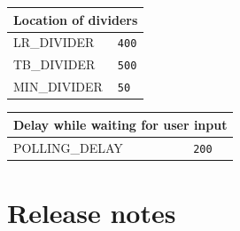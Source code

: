 \documentclass[11pt]{article}
\begin{document}
\begin{center}
\bigskip

\begin{tabular}{|p{}|p{}|}
\hline
\multicolumn{2}{|c|}{Location of dividers}\\ \hline
\textsc{\ttfamily LR\_DIVIDER} &\verb+400+\\
\textsc{\ttfamily TB\_DIVIDER} &\verb+500+\\
\textsc{\ttfamily MIN\_DIVIDER} &\verb+50+\\\hline
\end{tabular}

\bigskip

\begin{tabular}{|p{}|p{}|}
\hline
\multicolumn{2}{|c|}{Delay while waiting for user input}\\ \hline
\textsc{\ttfamily POLLING\_DELAY} &\verb+200+\\\hline
\end{tabular}

\end{center}

\section{Release notes}
\end{document}
